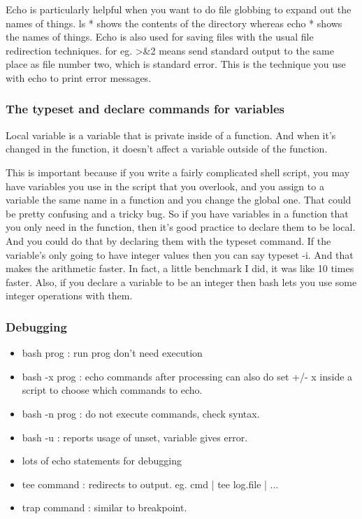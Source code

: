 Echo is particularly helpful when you want to do file globbing to expand out the names of things. ls * shows the contents of the directory whereas echo * shows the names of things.
Echo is also used for saving files with the usual file redirection techniques. for eg. >\&2 means send standard output to the same place as file number two, which is standard error. This is the technique you use with echo to print error messages.

\subsubsection{The typeset and declare commands for variables}
Local variable is a variable that is private inside of a function. And when it's changed in the function, it doesn't affect a variable outside of the function. 

This is important because if you write a fairly complicated shell script, you may have variables you use in the script that you overlook, and you assign to a variable the same name in a function and you change the global one. That could be pretty confusing and a tricky bug. So if you have variables in a function that you only need in the function, then it's good practice to declare them to be local. And you could do that by declaring them with the typeset command. If the variable's only going to have integer values then you can say typeset -i. And that makes the arithmetic faster. In fact, a little benchmark I did, it was like 10 times faster. Also, if you declare a variable to be an integer then bash lets you use some integer operations with them.


\subsubsection{Debugging}

\begin{itemize}
    \item  bash prog : run prog don't need execution 
    \item  bash -x prog : echo commands after processing can also do set +/- x inside a script to choose which commands to echo.
    \item  bash -n prog : do not execute commands, check syntax.
    \item  bash -u : reports usage of unset, variable gives error.
    \item  lots of echo statements for debugging
    \item  tee command : redirects to output. eg. cmd | tee log.file | ...
    \item  trap command : similar to breakpoint. 
\end{itemize}

